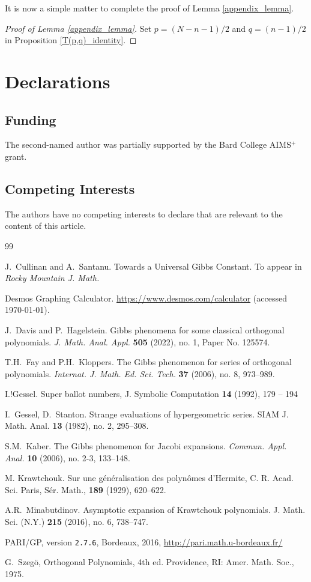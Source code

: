 \documentclass{amsart}
\theoremstyle{plain}
\theoremstyle{remark}
\begin{document}
It is now a simple matter to complete the proof of Lemma \ref{appendix_lemma}. 

\begin{proof}[Proof of Lemma \ref{appendix_lemma}]
Set $p=(N-n-1)/2$ and $q=(n-1)/2$ in Proposition \ref{T(p,q)_identity}.
\end{proof}

\section{Declarations}

\subsection{Funding} The second-named author was partially supported by the Bard College AIMS$^+$ grant.

\subsection{Competing Interests} The authors have no competing interests to declare that are relevant to the content of this article.

\vfill

\begin{thebibliography}{99}

 J.~Cullinan and A.~Santanu. Towards a Universal Gibbs Constant. To appear in \emph{Rocky Mountain J. Math.}

 Desmos Graphing Calculator. \href{https://www.desmos.com/calculator}{https://www.desmos.com/calculator} (accessed \today).

 J.~Davis and P.~Hagelstein. Gibbs phenomena for some classical orthogonal polynomials. \emph{J. Math. Anal. Appl.} \textbf{505} (2022), no. 1, Paper No. 125574.

 T.H.~Fay and P.H.~Kloppers. The Gibbs phenomenon for series of orthogonal polynomials. \emph{Internat. J. Math. Ed. Sci. Tech.} \textbf{37} (2006), no. 8, 973--989.

 I.!Gessel. Super ballot numbers, J. Symbolic Computation \textbf{14} (1992), 179 -- 194

 I.~Gessel, D.~Stanton. Strange evaluations of hypergeometric series. SIAM J. Math. Anal. \textbf{13} (1982), no. 2, 295--308.

S.M.~Kaber. The Gibbs phenomenon for Jacobi expansions. 
\emph{Commun. Appl. Anal.} \textbf{10} (2006), no. 2-3, 133--148.

 M. Krawtchouk. Sur une g\'en\'eralisation des polyn\^omes d’Hermite, C. R.
Acad. Sci. Paris, Sér. Math., \textbf{189} (1929), 620--622.

 A.R.~Minabutdinov. Asymptotic expansion of Krawtchouk polynomials. J. Math. Sci. (N.Y.) \textbf{215} (2016), no. 6, 738--747.

 PARI/GP, version {\tt 2.7.6}, Bordeaux, 2016, \url{http://pari.math.u-bordeaux.fr/}

 G.~Szeg\"{o}, Orthogonal Polynomials, 4th ed. Providence, 
RI: Amer. Math. Soc., 1975.
\end{thebibliography}
\end{document}
